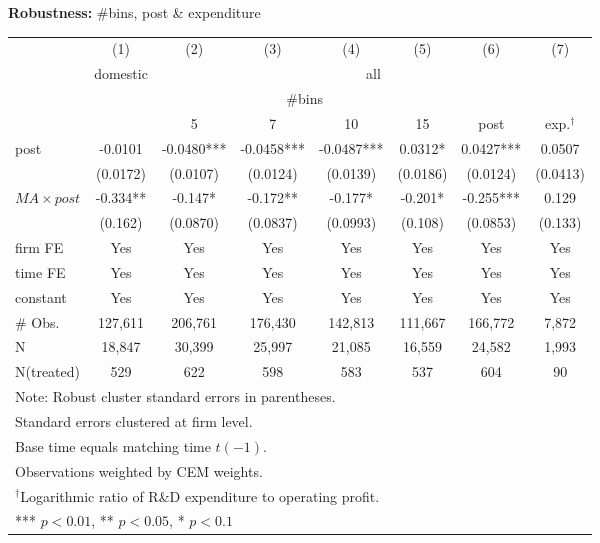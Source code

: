 \documentclass{beamer} %
\begin{document}
\begin{frame}[label=robustness]{\textbf{Robustness:} \#bins, post \& expenditure}
    \begin{tiny}
	\begin{table}
	\centering
	\begin{tabular}{lccccccc}
		\midrule
		& (1)   & (2)   & (3)   & (4)   & (5)   & (6)   & (7) \\
		& domestic & \multicolumn{6}{c}{all} \\
		\cmidrule{3-8}          &       & \multicolumn{4}{c}{\#bins}    &       &  \\
		\cmidrule{3-6}          &       & 5     & 7     & 10    & 15    & post  & exp.$^{\dag}$ \\
		\midrule
		post  & -0.0101 & -0.0480*** & -0.0458*** & -0.0487*** & 0.0312* & 0.0427*** & 0.0507 \\
		& (0.0172) & (0.0107) & (0.0124) & (0.0139) & (0.0186) & (0.0124) & (0.0413) \\
		$MA\times post$ & -0.334** & -0.147* & -0.172** & -0.177* & -0.201* & -0.255*** & 0.129 \\
		& (0.162) & (0.0870) & (0.0837) & (0.0993) & (0.108) & (0.0853) & (0.133) \\
		\midrule
		firm FE & Yes   & Yes   & Yes   & Yes   & Yes   & Yes   & Yes \\
		time FE & Yes   & Yes   & Yes   & Yes   & Yes   & Yes   & Yes \\
		constant & Yes   & Yes   & Yes   & Yes   & Yes   & Yes   & Yes \\
		\midrule
		\# Obs. & 127,611 & 206,761 & 176,430 & 142,813 & 111,667 & 166,772 & 7,872 \\
		N     & 18,847 & 30,399 & 25,997 & 21,085 & 16,559 & 24,582 & 1,993 \\
		N(treated) & 529   & 622   & 598   & 583   & 537   & 604   & 90 \\
		\midrule
		\multicolumn{8}{l}{\tiny{Note: Robust cluster standard errors in parentheses.}}  \\
		\multicolumn{8}{l}{\tiny{Standard errors clustered at firm level.}}       \\
		\multicolumn{8}{l}{\tiny{Base time equals matching time $t(-1)$.}}  \\
		\multicolumn{8}{l}{\tiny{Observations weighted by CEM weights.}}  \\
		\multicolumn{8}{l}{\tiny{$^{\dag}$Logarithmic ratio of R\&D expenditure to operating profit.}}  \\
		\multicolumn{8}{l}{\tiny{*** $p<0.01$, ** $p<0.05$, * $p<0.1$}}  \\
	\end{tabular}
	\label{tab:att_robust}%
    \end{table}%
    \end{tiny}
\end{frame}
\end{document}
